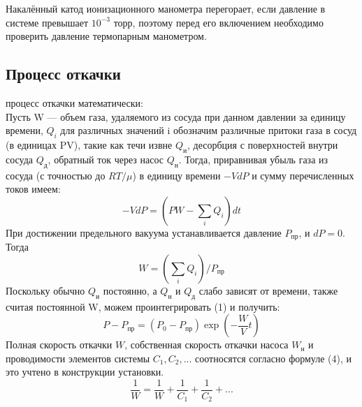 \documentclass[12pt,a4paper]{article}
\begin{document}
Накалённый катод ионизационного манометра \linebreak перегорает, если давление в системе превышает $10^{-3}$ торр, поэтому перед его включением необходимо проверить давление термопарным манометром. \\
\subsection*{Процесс откачки}
 процесс откачки математически: \\

Пусть W --- объем газа, удаляемого из сосуда при данном давлении за единицу времени, $Q_i$ для различных значений i обозначим различные притоки газа в сосуд (в единицах PV), такие как течи извне $Q_\text{и}$, десорбция с поверхностей внутри сосуда $Q_\text{д}$, обратный ток через насос $Q_\text{н}$. Тогда, приравнивая убыль газа из сосуда (с точностью до $RT/\mu$) в единицу времени $-VdP$ и сумму перечисленных токов имеем:
\begin{equation}
    -VdP = (PW - \sum_i Q_i)dt
\end{equation}
При достижении предельного вакуума устанавливается давление $P_{\text{пр}}$, и $dP = 0$. Тогда
\begin{equation}
W = ( \sum_i Q_i )/P_{\text{пр}}
\end{equation}
Поскольку обычно $Q_\text{и}$ постоянно, а $Q_\text{н}$ и $Q_\text{д}$ слабо зависят от времени, также считая постоянной W, можем проинтегрировать (1) и получить:
\begin{equation}
    P - P_{\text{пр}} = (P_0 - P_{\text{пр}})\exp(-\frac{W}{V}t)
\end{equation}
Полная скорость откачки $W$, собственная скорость откачки насоса $W_{\text{н}}$ и проводимости элементов системы $C_1, C_2,...$ соотносятся согласно формуле (4), и это учтено в конструкции установки.
\begin{equation}
\frac{1}{W} = \frac{1}{W} + \frac{1}{C_1} + \frac{1}{C_2} + ...
\end{equation}

\newpage
\end{document}
